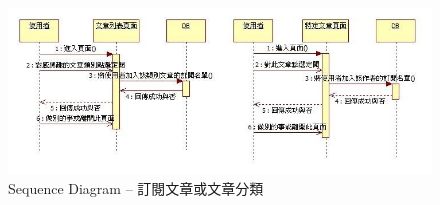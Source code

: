 \begin{figure}[H]
\centering
\includegraphics[width=\textwidth]{img/useseq/stage2/seqSearch.jpg}
\caption{Sequence Diagram -- 訂閱文章或文章分類}
\label{pic:seq:search}
\end{figure}





